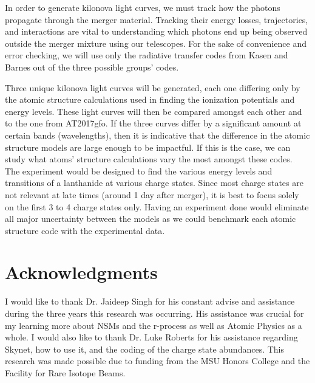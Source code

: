 \documentclass[11pt,a4paper]{article}
\begin{document}
In order to generate kilonova light curves, we must track how the photons propagate through the merger material. Tracking their energy losses, trajectories, and interactions are vital to understanding which photons end up being observed outside the merger mixture using our telescopes. For the sake of convenience and error checking, we will use only the radiative transfer codes from Kasen and Barnes out of the three possible groups' codes.

Three unique kilonova light curves will be generated, each one differing only by the atomic structure calculations used in finding the ionization potentials and energy levels. These light curves will then be compared amongst each other and to the one from AT2017gfo. If the three curves differ by a significant amount at certain bands (wavelengths), then it is indicative that the difference in the atomic structure models are large enough to be impactful. If this is the case, we can study what atoms' structure calculations vary the most amongst these codes.\\  

The experiment would be designed to find the various energy levels and transitions of a lanthanide at various charge states. Since most charge states are not relevant at late times (around 1 day after merger), it is best to focus solely on the first 3 to 4 charge states only. Having an experiment done would eliminate all major uncertainty between the models as we could benchmark each atomic structure code with the experimental data.

\section{Acknowledgments}

\hspace{8mm} I would like to thank Dr. Jaideep Singh for his constant advise and assistance during the three years this research was occurring. His assistance was crucial for my learning more about NSMs and the r-process as well as Atomic Physics as a whole. I would also like to thank Dr. Luke Roberts for his assistance regarding Skynet, how to use it, and the coding of the charge state abundances. This research was made possible due to funding from the MSU Honors College and the Facility for Rare Isotope Beams.


\end{document}
